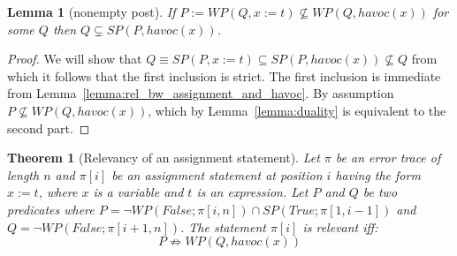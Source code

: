 \documentclass{article}
\newcommand{\limp}{\Rightarrow}
\newcommand{\WP}[2]{\mathit{WP}(#1,#2)}
\newcommand{\SP}[2]{\mathit{SP}(#1,#2)}
\newcommand{\havoc}{\mathit{havoc}}
\newtheorem{theorem}{Theorem}
\newtheorem{lemma}{Lemma}
\begin{document}
\begin{lemma}[nonempty post]\label{lemma:nonempty_post}
	If $P := \WP{Q}{x := t} \nsubseteq \WP{Q}{\havoc(x)}$ for some $Q$ then $Q \subsetneq \SP{P}{\havoc(x)}$.
\end{lemma}
\begin{proof}
	We will show that $Q \equiv \SP{P}{x := t} \subseteq \SP{P}{\havoc(x)} \not\subseteq Q$ from which it follows that the first inclusion is strict.
	The first inclusion is immediate from Lemma~\ref{lemma:rel_bw_assignment_and_havoc}.
	By assumption $P \not\subseteq \WP{Q}{\havoc(x)}$, which by Lemma~\ref{lemma:duality} is equivalent to the second part.
\end{proof}

\newpage

\begin{theorem}[Relevancy of an assignment statement]\label{mydef:relevancytheorem}
Let $\pi$ be an error trace of length $n$ and $\pi[i]$ be an assignment statement at position $i$ having the form $x:=t$, where $x$ is a variable and $t$ is an expression. Let $P$ and $Q$ be two predicates where $P = \neg WP(False; \pi[i,n]) \cap SP(True; \pi[1, i-1])$ and $Q =  \neg WP(False; \pi[i+1,n])$. The statement $\pi[i]$ is relevant iff:
 $$P \not \limp WP(Q,havoc(x))$$
\end{theorem}
\end{document}
